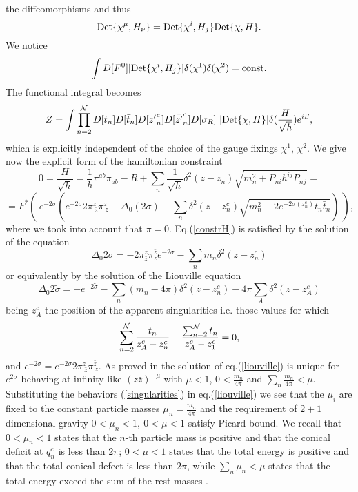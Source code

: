 \documentclass[a4paper,12pt]{article}
\begin{document}
the diffeomorphisms and thus
\begin{equation}
{\rm Det}\{\chi^{\mu}, H_{\nu}\}={\rm Det}\{\chi^i, H_j\}{\rm
Det}\{\chi, H\}. 
\end{equation}
We notice
\begin{equation}\label{volume_chi_i}
\int D[F^0] |{\rm Det}\{\chi^i, H_j\}|\delta(\chi^1)\delta(\chi^2)=
{\rm const.} 
\end{equation}
The functional integral becomes
\begin{equation}\label{functional_sigma} 
Z= \int \prod_{n=2}^{\cal N}D[t_n]D[\bar t_n]D[{z'}^c_n]D[{\bar {z'}}^c_n]
D[\sigma_R]~%
|{\rm Det}\{\chi, H\}|
\delta(\frac{H}{\sqrt{h}}) 
e^{i S},
\end{equation}
which is explicitly independent of the choice of the gauge fixings
$\chi^1$, $\chi^2$.
We give now the explicit form of the hamiltonian constraint
$$
0=\frac{H}{\sqrt h}=\frac{1}{h}\pi^{ab}\pi_{ab}-R+
\sum_n \frac{1}{\sqrt h}\delta^2(z-z_n) \sqrt{m_n^2+P_{ni}h^{ij}P_{nj}}=
$$
\begin{equation}\label{constrH}
=F^*\left(~e^{-2\sigma}\left(e^{-2\sigma}2\pi^z_{~\bar z}\pi^{\bar
z}_{~z}+\Delta_0(2\sigma)+ \sum_n \delta^2(z-z^c_n)
\sqrt{m_n^2+ 2e^{-2\sigma(z^c_n)} t_n \bar t_n}\right)~\right),
\end{equation}
where we took into account that $\pi=0$.
Eq.(\ref{constrH}) is satisfied by the solution of the equation \cite{MS}
\begin{equation}\label{liouville}
\Delta_0 2\sigma= - 2\pi^z_{\bar z} \pi^{\bar z}_z e^{-2\sigma}-\sum_n m_n
\delta^2(z-z_n^c)
\end{equation}
or equivalently by the solution of the Liouville equation
\begin{equation}\label{tildeliouville}
\Delta_0{2\tilde{\sigma}}=-e^{-2\tilde{\sigma}}-\sum_n (m_n-4\pi)
\delta^2(z-z_n^c) -4\pi \sum_A \delta^2(z-z^c_A)
\end{equation}
being $z^c_A$ the position of the apparent singularities i.e. those
values for which
\begin{equation}
\sum_{n=2}^{\cal N}\frac{t_n}{z^c_A-z^c_n}-\frac{\sum_{n=2}^{\cal N}
t_n}{z^c_A-z^c_1}=0, 
\end{equation}
and $e^{-2\tilde{\sigma}}=e^{-2\sigma}2\pi^z_{~\bar z}\pi^{\bar
z}_{~z}$. As proved in \cite{picard, licht, troyanov} the
solution of eq.(\ref{liouville}) is unique for $e^{2\sigma}$ behaving
at infinity like $(z\bar z)^{-\mu}$ with $\mu<1$, $0<\frac{m_n}{4\pi}$
and $\sum_n \frac{m_n}{4\pi}<\mu$.  Substituting the behaviors
(\ref{singularities}) in eq.(\ref{liouville}) we see that the $\mu_i$
are fixed to the constant particle masses $\mu_n=\frac{m_n}{4\pi}$ and
the requirement of $2+1$ dimensional gravity $0<\mu_n<1,~0<\mu<1$
satisfy Picard  bound. We recall that $0<\mu_n<1$ states that the
$n$-th particle mass is positive and that the conical deficit at $q^c_n$ is 
less than $2\pi$; $0<\mu<1$ states that the total energy is positive
and that the total conical defect is less than $2\pi$, while
$\sum_n \mu_n <\mu$ states that the total energy exceed the sum of the rest
masses \cite{MS,CMS1}. 
\end{document}
